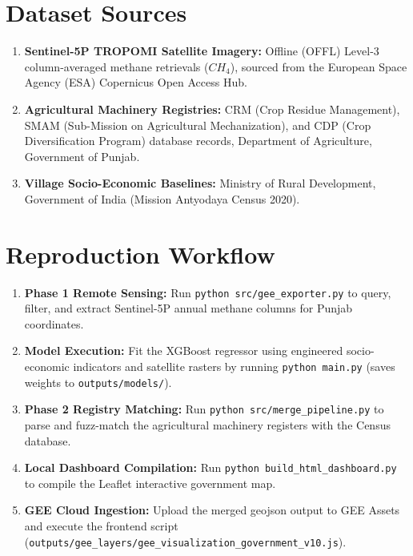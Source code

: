 \documentclass[12pt,a4paper]{report}
\begin{document}
\vspace{0.6cm}

\section*{Dataset Sources}
\begin{enumerate}
    \item \textbf{Sentinel-5P TROPOMI Satellite Imagery:} Offline (OFFL) Level-3 column-averaged methane retrievals ($CH_4$), sourced from the European Space Agency (ESA) Copernicus Open Access Hub.
    \item \textbf{Agricultural Machinery Registries:} CRM (Crop Residue Management), SMAM (Sub-Mission on Agricultural Mechanization), and CDP (Crop Diversification Program) database records, Department of Agriculture, Government of Punjab.
    \item \textbf{Village Socio-Economic Baselines:} Ministry of Rural Development, Government of India (Mission Antyodaya Census 2020).
\end{enumerate}

\section*{Reproduction Workflow}
\begin{enumerate}
    \item \textbf{Phase 1 Remote Sensing:} Run \texttt{python src/gee_exporter.py} to query, filter, and extract Sentinel-5P annual methane columns for Punjab coordinates.
    \item \textbf{Model Execution:} Fit the XGBoost regressor using engineered socio-economic indicators and satellite rasters by running \texttt{python main.py} (saves weights to \texttt{outputs/models/}).
    \item \textbf{Phase 2 Registry Matching:} Run \texttt{python src/merge_pipeline.py} to parse and fuzz-match the agricultural machinery registers with the Census database.
    \item \textbf{Local Dashboard Compilation:} Run \texttt{python build_html_dashboard.py} to compile the Leaflet interactive government map.
    \item \textbf{GEE Cloud Ingestion:} Upload the merged geojson output to GEE Assets and execute the frontend script (\texttt{outputs/gee_layers/gee_visualization_government_v10.js}).
\end{enumerate}

\newpage
\end{document}
